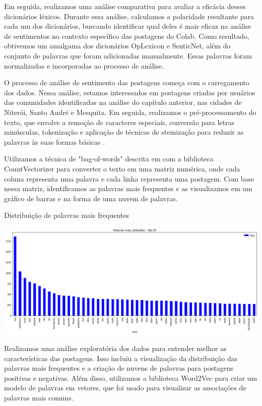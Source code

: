 Em seguida, realizamos uma análise comparativa para avaliar a eficácia desses dicionários léxicos. Durante essa análise, calculamos a polaridade resultante para cada um dos dicionários, buscando identificar qual deles é mais eficaz na análise de sentimentos no contexto específico das postagens do Colab. Como resultado, obtivemos um amalgama dos dicionários OpLexicon e SenticNet, além do conjunto de palavras que foram adicionadas manualmente. Essas palavras foram normalizadas e incorporadas ao processo de análise.

O processo de análise de sentimento das postagens começa com o carregamento dos dados. Nessa análise, estamos interessados em postagens criadas por usuários das comunidades identificadas na análise do capítulo anterior, nas cidades de Niterói, Santo André e Mesquita. Em seguida, realizamos o pré-processamento do texto, que envolve a remoção de caracteres especiais, conversão para letras minúsculas, tokenização e aplicação de técnicas de stemização para reduzir as palavras às suas formas básicas \cite[]{2009_Bird_BOOK}.

Utilizamos a técnica de "bag-of-words" descrita em  com a biblioteca CountVectorizer para converter o texto em uma matriz numérica, onde cada coluna representa uma palavra e cada linha representa uma postagem. Com base nessa matriz, identificamos as palavras mais frequentes e as visualizamos em um gráfico de barras e na forma de uma nuvem de palavras.

\begin{quadro}[!htb]
	\caption{Distribuição de palavras mais frequentes}
	\label{fig:wordcount}
	\centering
	\includegraphics[width=\textwidth]{images/wordcount.png}
	\fautor
\end{quadro}

Realizamos uma análise exploratória dos dados para entender melhor as características das postagens. Isso incluiu a visualização da distribuição das palavras mais frequentes e a criação de nuvens de palavras para postagens positivas e negativas. Além disso, utilizamos a biblioteca Word2Vec para criar um modelo de palavras em vetores, que foi usado para visualizar as associações de palavras mais comuns.

